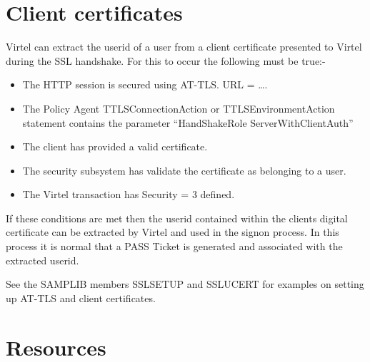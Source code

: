 \documentclass[letterpaper,10pt,english]{sphinxmanual}
\begin{document}
\section{Client certificates}
\label{\detokenize{connectivity_guide:index-161}}\label{\detokenize{connectivity_guide:client-certificates}}
Virtel can extract the userid of a user from a client certificate presented to Virtel during the SSL handshake. For this to occur the following must be true:-
\begin{itemize}
\item {} 
The HTTP session is secured using AT-TLS. URL = ….

\item {} 
The Policy Agent TTLSConnectionAction or TTLSEnvironmentAction statement contains the parameter “HandShakeRole ServerWithClientAuth”

\item {} 
The client has provided a valid certificate.

\item {} 
The security subsystem has validate the certificate as belonging to a user.

\item {} 
The Virtel transaction has Security = 3 defined.

\end{itemize}

If these conditions are met then the userid contained within the clients digital certificate can be extracted by Virtel and used in the signon process. In this process it is normal that a PASS Ticket is generated and associated with the extracted userid.

See the SAMPLIB members SSLSETUP and SSLUCERT for examples on setting up AT-TLS and client certificates.

\newpage


\section{Resources}
\label{\detokenize{connectivity_guide:index-162}}\label{\detokenize{connectivity_guide:resources}}
\end{document}
